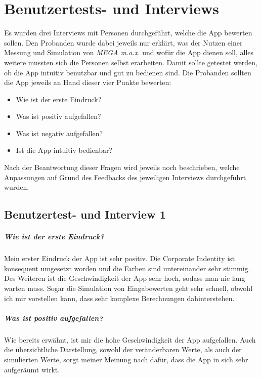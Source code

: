 \chapter{Benutzertests- und Interviews}
\label{chap:flinterviews}

	Es wurden drei Interviews mit Personen durchgeführt, welche die App bewerten sollen. Den Probanden wurde dabei jeweils nur erklärt, was der Nutzen einer Messung und Simulation von \textit{MEGA m.a.x.} und wofür die App dienen soll, alles weitere mussten sich die Personen selbst erarbeiten. Damit sollte getestet werden, ob die App intuitiv benutzbar und gut zu bedienen sind. Die Probanden sollten die App jeweils an Hand dieser vier Punkte bewerten:
	\begin{itemize}
		\item Wie ist der erste Eindruck?
		\item Was ist positiv aufgefallen?
		\item Was ist negativ aufgefallen?
		\item Ist die App intuitiv bedienbar?
	\end{itemize}

	Nach der Beantwortung dieser Fragen wird jeweils noch beschrieben, welche Anpassungen auf Grund des Feedbacks des jeweiligen Interviews durchgeführt wurden.

	\section{Benutzertest- und Interview 1}
	\label{sec:flinterview1}
	
	\paragraph{Wie ist der erste Eindruck?}
	
		Mein erster Eindruck der App ist sehr positiv. Die Corporate Indentity ist konsequent umgesetzt worden und die Farben sind untereinander sehr stimmig. Des Weiteren ist die Geschwindigkeit der App sehr hoch, sodass man nie lang warten muss. Sogar die Simulation von Eingabewerten geht sehr schnell, obwohl ich mir vorstellen kann, dass sehr komplexe Berechnungen dahinterstehen.
	
	\paragraph{Was ist positiv aufgefallen?}
		
		Wie bereits erwähnt, ist mir die hohe Geschwindigkeit der App aufgefallen. Auch die übersichtliche Darstellung, sowohl der veränderbaren Werte, als auch der simulierten Werte, sorgt meiner Meinung nach dafür, dass die App in sich sehr aufgeräumt wirkt.
	
